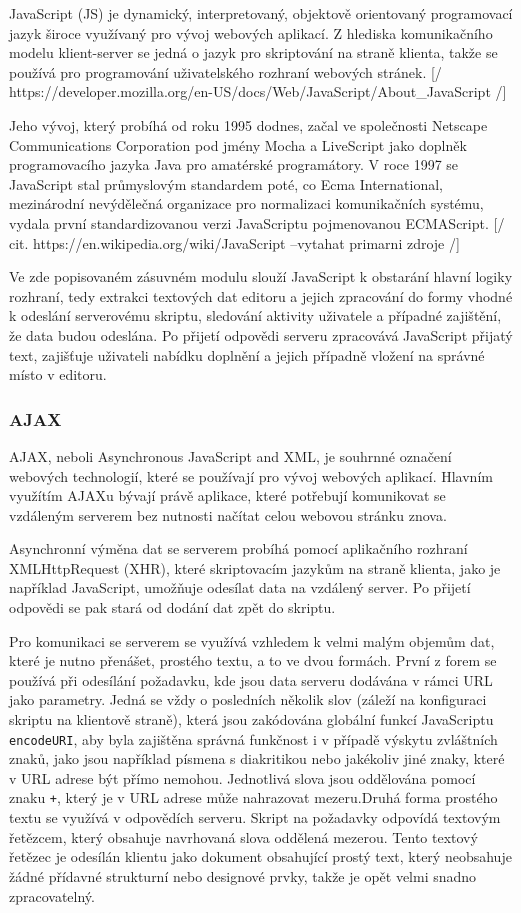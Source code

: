\documentclass{article}
\begin{document}
JavaScript (JS) je dynamický, interpretovaný, objektově orientovaný programovací jazyk široce využívaný pro vývoj webových aplikací. Z hlediska komunikačního modelu klient-server se jedná o jazyk pro skriptování na straně klienta, takže se používá pro programování uživatelského rozhraní webových stránek. [/ https://developer.mozilla.org/en-US/docs/Web/JavaScript/About_JavaScript /]

Jeho vývoj, který probíhá od roku 1995 dodnes, začal ve společnosti Netscape Communications Corporation pod jmény Mocha a LiveScript jako doplněk programovacího jazyka Java pro amatérské programátory. V roce 1997 se JavaScript stal průmyslovým standardem poté, co Ecma International, mezinárodní nevýdělečná organizace pro normalizaci komunikačních systému, vydala první standardizovanou verzi JavaScriptu pojmenovanou ECMAScript. [/ cit. https://en.wikipedia.org/wiki/JavaScript --vytahat primarni zdroje /]

Ve zde popisovaném zásuvném modulu slouží JavaScript k obstarání hlavní logiky rozhraní, tedy extrakci textových dat editoru a jejich zpracování do formy vhodné k odeslání serverovému skriptu, sledování aktivity uživatele a případné zajištění, že data budou odeslána. Po přijetí odpovědi serveru zpracovává JavaScript přijatý text, zajišťuje uživateli nabídku doplnění a jejich případně vložení na správné místo v editoru. 

\subsubsection{AJAX}

AJAX, neboli Asynchronous JavaScript and XML, je souhrnné označení webových technologií, které se používají pro vývoj webových aplikací. Hlavním využítím AJAXu bývají právě aplikace, které potřebují komunikovat se vzdáleným serverem bez nutnosti načítat celou webovou stránku znova. 

Asynchronní výměna dat se serverem probíhá pomocí aplikačního rozhraní XMLHttpRequest (XHR), které skriptovacím jazykům na straně klienta, jako je například JavaScript, umožňuje odesílat data na vzdálený server. Po přijetí odpovědi se pak stará od dodání dat zpět do skriptu.

Pro komunikaci se serverem se využívá vzhledem k velmi malým objemům dat, které je nutno přenášet, prostého textu, a to ve dvou formách. První z forem se používá při odesílání požadavku, kde jsou data serveru dodávána v rámci URL jako parametry. Jedná se vždy o posledních několik slov (záleží na konfiguraci skriptu na klientově straně), která jsou zakódována globální funkcí JavaScriptu {\tt encodeURI}, aby byla zajištěna správná funkčnost i v případě výskytu zvláštních znaků, jako jsou například písmena s diakritikou nebo jakékoliv jiné znaky, které v URL adrese být přímo nemohou. Jednotlivá slova jsou oddělována pomocí znaku {\tt +}, který je v URL adrese může nahrazovat mezeru.Druhá forma prostého textu se využívá v odpovědích serveru. Skript na požadavky odpovídá textovým řetězcem, který obsahuje navrhovaná slova oddělená mezerou. Tento textový řetězec je odesílán klientu jako dokument obsahující prostý text, který neobsahuje žádné přídavné strukturní nebo designové prvky, takže je opět velmi snadno zpracovatelný.
\end{document}
